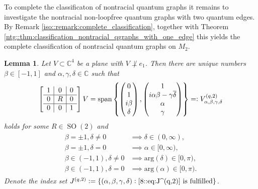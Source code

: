 \documentclass{amsart}
\newtheorem{lemma}[thm]{Lemma}
\newcommand{\C}{\mathbb{C}}
\DeclareMathOperator{\SO}{SO}
\DeclareMathOperator{\spann}{span}
\begin{document}
To complete the classificaton of nontracial quantum graphs it remains to investigate the nontracial non-loopfree quantum graphs with two quantum edges. By Remark \ref{iso::remark:complete_classification}, together with Theorem \ref{ntg::thm:classification_nontracial_qgraphs_with_one_edge} this yields the complete classification of nontracial quantum graphs on $M_2$.

\begin{lemma}
\label{ntg::lemma:2edges_plane_classification}
    Let $V \subset \C^4$ be a plane with $V \not \perp e_1$. 
    Then there are unique numbers $\beta \in [-1, 1]$ and $\alpha, \gamma, \delta \in \C$ such that 
    \begin{align*}
        \left[\begin{array}{c|c|c}
            1& 0 & 0 \\
            \hline
            0 & R & 0 \\
            \hline 
            0 & 0 & 1
            \end{array}\right]
        V = 
            \spann \left\{ \begin{pmatrix}
                0 \\ 1 \\ i \beta \\ \delta
            \end{pmatrix}, \begin{pmatrix}
                1 \\ i \alpha \beta - \gamma \overline{\delta} \\ \alpha \\ \gamma
            \end{pmatrix} \right\}
            =\vcentcolon V^{(q,2)}_{\alpha,\beta,\gamma,\delta}
    \end{align*}
    holds for some $R \in \SO(2)$ and
    \begin{align}
        \label{8::eq:J^(q,2)}\tag{$\ast$}
        \begin{aligned}
            \beta = \pm 1, \delta \neq 0 &\implies \delta \in (0, \infty), \\
            \beta = \pm 1, \delta = 0 &\implies \alpha \in [0, \infty), \\
            \beta \in (-1,1), \delta \neq 0 &\implies \mathrm{arg}(\delta) \in [0, \pi), \\
            \beta \in (-1,1), \delta = 0 &\implies \mathrm{arg}(\alpha) \in [0, \pi).
        \end{aligned}
    \end{align}
    Denote the index set 
    $J^{(q,2)}\vcentcolon=
        \{(\alpha,\beta,\gamma,\delta)\vcentcolon\text{\eqref{8::eq:J^(q,2)} is fulfilled}\}$.
\end{lemma}
\end{document}
